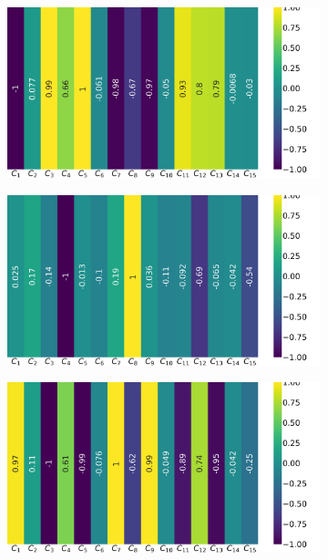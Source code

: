 \begin{figure}[!h]
	\centering
	\begin{subfigure}{0.49\linewidth}
		\includegraphics[width=\linewidth]{img/qlp_corr/An_coil0.png}
	\end{subfigure}
	\begin{subfigure}{0.49\linewidth}
		\includegraphics[width=\linewidth]{img/qlp_corr/An_coil1.png}
	\end{subfigure}
	\begin{subfigure}{0.49\linewidth}
		\includegraphics[width=\linewidth]{img/qlp_corr/An_coil2.png}

\end{subfigure}
\end{figure}

